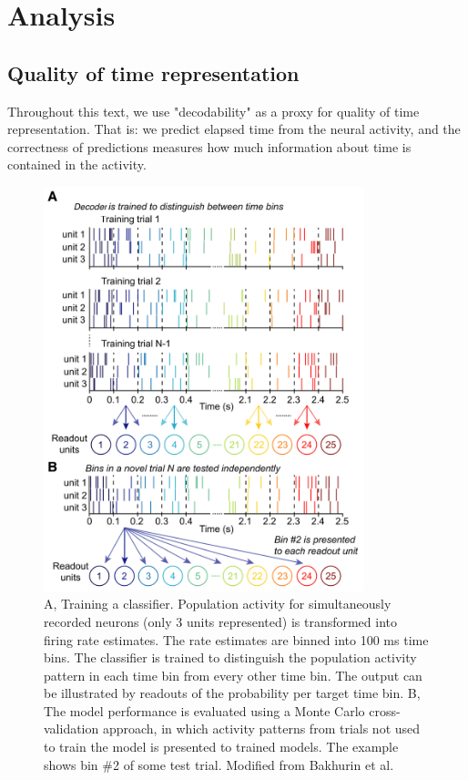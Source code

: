 \chapter{Analysis}

\section{Quality of time representation}

    Throughout this text, we use "decodability" as a proxy for quality of time representation. That is: we predict elapsed time from the neural activity, and the correctness of predictions measures how much information about time is contained in the activity. 

    \begin{figure}[ht!]
        \centering
        \includegraphics[width=0.83\textwidth]{figures/sketches/decoder.png}
        \caption[Classifier training sketch]{A, Training a classifier. Population activity for simultaneously recorded neurons (only 3 units represented) is transformed into firing rate estimates. The rate estimates are binned into 100 ms time bins. The classifier is trained to distinguish the population activity pattern in each time bin from every other time bin. The output can be illustrated by readouts of the probability per target time bin. B, The  model performance is evaluated using a Monte Carlo cross-validation approach, in which activity patterns from trials not used to train the model is presented to trained models. The example shows bin \#2 of some test trial. Modified from Bakhurin et al. \cite{bakhurin2017differential}}
        \label{fig:decoding}
    \end{figure}

